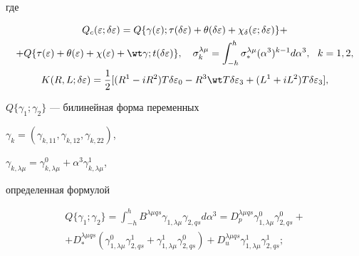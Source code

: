 где 


\begin{gather} 


Q_c(\varepsilon;\delta\varepsilon)=Q\{\gamma(\varepsilon); 


\tau(\delta\varepsilon)+\theta(\delta\varepsilon)+ 


\chi_\delta(\varepsilon;\delta\varepsilon)\}+ \notag \\ 


% 


+Q\{\tau(\varepsilon)+\theta(\varepsilon)+\chi(\varepsilon) 


+\wt\gamma;t(\delta\varepsilon)\},\quad 


\sigma^{\lambda\mu}_k=\int^h_{-h}\sigma^{\lambda\mu}_* 


(\alpha^3)^{k-1}d\alpha^3,\ \ k=1,2, \\ 


% 


K(R,L;\delta\varepsilon)=\frac{1}{2}[(R^1-i R^2) 


T\delta\varepsilon_0-R^3\wt T\delta\varepsilon_3+ 


(L^1+i L^2)T\delta\varepsilon_3], 


\end{gather} 


$Q\{\gamma_1;\gamma_2\}$ --- билинейная форма переменных 


$\gamma_k=(\gamma_{k,11},\gamma_{k,12},\gamma_{k,22})$, 


$\gamma_{k,\lambda\mu}=\gamma^0_{k,\lambda\mu}+ 


\alpha^3\gamma^1_{k,\lambda\mu}$, 


определенная формулой 


\begin{multline} 


Q\{\gamma_1;\gamma_2\}=\int^h_{-h}B^{\lambda\mu qs} 


\gamma_{1,\lambda\mu}\gamma_{2,qs}d\alpha^3= 


D^{\lambda\mu qs}_p\gamma^0_{1,\lambda\mu} 


\gamma^0_{2,qs}+ \\ +D^{\lambda\mu qs}_* 


(\gamma^0_{1,\lambda\mu}\gamma^1_{2,qs}+ 


\gamma^1_{1,\lambda\mu}\gamma^0_{2,qs}) 


+D^{\lambda\mu qs}_u\gamma^1_{1,\lambda\mu}\gamma^1_{2,qs}; 


\end{multline} 


